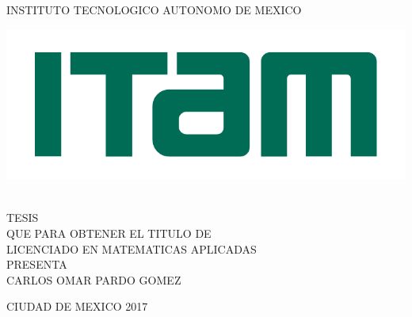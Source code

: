 \begin{titlepage}
\begin{center}

\large{INSTITUTO TECNOLOGICO AUTONOMO DE MEXICO}\\[2em]
\hline

\begin{center}
	\includegraphics{Figures/Miscellaneous/logo-ITAM.pdf}
\end{center}

\vspace{1em}

{}\\[3em]

\textsc{\large TESIS}\\[1em]

\textsc{\normalsize QUE PARA OBTENER EL TITULO DE}\\[1em]

\textsc{\normalsize LICENCIADO EN MATEMATICAS APLICADAS}\\[1em]

\textsc{\normalsize PRESENTA}\\[1em]

\textsc{\Large CARLOS OMAR PARDO GOMEZ}\\[3em]

\end{center}

\vspace*{\fill}
\textsc{CIUDAD DE MEXICO \hspace*{\fill} 2017}

\end{titlepage}